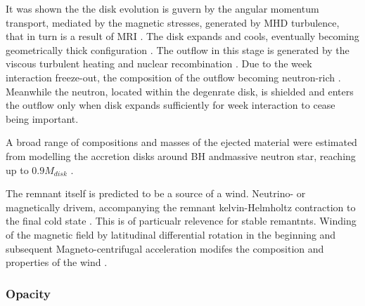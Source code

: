 \documentclass[11pt,a4paper,headinclude=true,DIV=14,BCOR=8mm,chapterprefix,listof=totoc,twoside,openright,abstracton]{scrbook}
\begin{document}
It was shown the the disk evolution is guvern by the angular momentum transport, mediated by the magnetic stresses, generated by MHD turbulence, that in turn is a result of MRI \cite{Metzger et al 2008a,Metzger et al 2009}. The disk expands and cools, eventually becoming geometrically thick configuration \cite{(see also Lee et al 2009; Beloborodov 2008)}.  The outflow in this stage is generated by the viscous turbulent heating and nuclear recombination \cite{(Kohri et al 2005)}. Due to the week interaction freeze-out, the composition of the outflow becoming neutron-rich \cite{(Metzger et al 2008a, 2009)}. Meanwhile the neutron, located within the degenrate disk, is shielded and enters the outflow only when disk expands sufficiently for week interaction to cease being important.

A broad range of compositions and masses of the ejected material were estimated from modelling the accretion disks around BH \cite{Fernandez and Metzger 2013; Just et al 2015,Fernandez et al 2015a,Kiuchi et al (2015)} andmassive neutron star, reaching up to $0.9M_{disk}$ \cite{Metzger and Fernandez 2014),(Kasen et al 2015)}.

The remnant itself is predicted to be a source of a wind. Neutrino- or magnetically drivem, accompanying the remnant kelvin-Helmholtz contraction to the final cold state \cite{(Dessart et al 2009)}. This is of particualr relevence for stable remantnts. Winding of the magnetic field by latitudinal differential rotation \cite{(Siegel et al 2014)} in the beginning and subsequent Magneto-centrifugal acceleration modifes the composition and properties of the wind \cite{(Metzger et al 2007; Vlasov et al 2014)}.


\subsubsection{Opacity}
\end{document}

